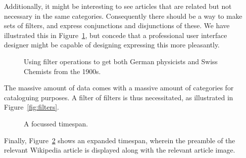 Additionally, it might be interesting to see articles that are related but not 
necessary in the same categories. Consequently there should be a way to make 
sets of filters, and express conjunctions and disjunctions of these. We have 
illustrated this in Figure~\ref{fig:filteropss}, but concede that a 
professional user interface designer might be capable of designing expressing 
this more pleasantly.

\begin{figure}[H]
  \centering
  \begin{scale}{0.5}
    
  \end{scale}
  \caption{Using filter operations to get both German physicists and Swiss Chemists from the 1900s.}
  \label{fig:filteropss}
\end{figure}

The massive amount of data comes with a massive amount of categories for 
cataloguing purposes. A filter of filters is thus necessitated, as illustrated 
in Figure~\ref{fig:filters}.

\begin{figure}[H]
  \centering
  \begin{scale}{0.3}
    
  \end{scale}
  \caption{A focussed timespan.}
  \label{fig:focussed}
\end{figure}

Finally, Figure~\ref{fig:focussed} shows an expanded timespan, wherein the 
preamble of the relevant Wikipedia article is displayed along with the 
relevant article image.
